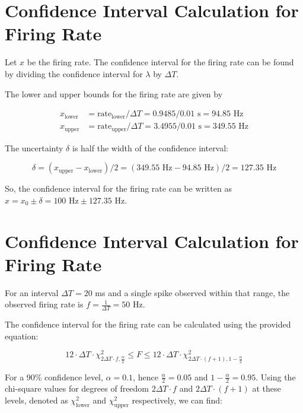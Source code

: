 \section*{Confidence Interval Calculation for Firing Rate}

Let $x$ be the firing rate. The confidence interval for the firing rate can be found by dividing the confidence interval for $\lambda$ by $\Delta T$.

The lower and upper bounds for the firing rate are given by

\begin{align*}
x_{\text{lower}} &= \text{rate}_{\text{lower}} / \Delta T = 0.9485 / 0.01 \text{ s} = 94.85 \text{ Hz} \\
x_{\text{upper}} &= \text{rate}_{\text{upper}} / \Delta T = 3.4955 / 0.01 \text{ s} = 349.55 \text{ Hz}
\end{align*}

The uncertainty $\delta$ is half the width of the confidence interval:

\begin{equation*}
\delta = (x_{\text{upper}} - x_{\text{lower}}) / 2 = (349.55 \text{ Hz} - 94.85 \text{ Hz}) / 2 = 127.35 \text{ Hz}
\end{equation*}

So, the confidence interval for the firing rate can be written as $x = x_0 \pm \delta = 100 \text{ Hz} \pm 127.35 \text{ Hz}$.


\section*{Confidence Interval Calculation for Firing Rate}

For an interval $\Delta T = 20$ ms and a single spike observed within that range, the observed firing rate is $f = \frac{1}{\Delta T} = 50$ Hz. 

The confidence interval for the firing rate can be calculated using the provided equation:

\begin{equation}
12 \cdot \Delta T \cdot \chi^{2}_{2\Delta T \cdot f, \frac{\alpha}{2}} \leq F \leq 12 \cdot \Delta T \cdot \chi^{2}_{2\Delta T \cdot (f+1), 1-\frac{\alpha}{2}}
\end{equation}

For a 90\% confidence level, $\alpha = 0.1$, hence $\frac{\alpha}{2} = 0.05$ and $1-\frac{\alpha}{2} = 0.95$. Using the chi-square values for degrees of freedom $2\Delta T \cdot f$ and $2\Delta T \cdot (f+1)$ at these levels, denoted as $\chi^{2}_{\text{lower}}$ and $\chi^{2}_{\text{upper}}$ respectively, we can find:

